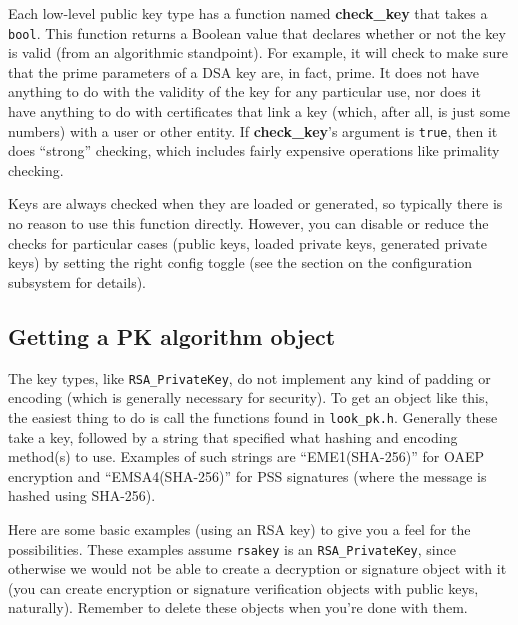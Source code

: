 \documentclass{article}
\newcommand{\filename}[1]{\texttt{#1}}
\newcommand{\function}[1]{\textbf{#1}}
\newcommand{\type}[1]{\texttt{#1}}
\begin{document}
Each low-level public key type has a function named \function{check\_key} that
takes a \type{bool}. This function returns a Boolean value that declares
whether or not the key is valid (from an algorithmic standpoint). For example,
it will check to make sure that the prime parameters of a DSA key are, in fact,
prime. It does not have anything to do with the validity of the key for any
particular use, nor does it have anything to do with certificates that link a
key (which, after all, is just some numbers) with a user or other entity. If
\function{check\_key}'s argument is \type{true}, then it does ``strong''
checking, which includes fairly expensive operations like primality checking.

Keys are always checked when they are loaded or generated, so typically there
is no reason to use this function directly. However, you can disable or reduce
the checks for particular cases (public keys, loaded private keys, generated
private keys) by setting the right config toggle (see the section on the
configuration subsystem for details).

\subsection{Getting a PK algorithm object}

The key types, like \type{RSA\_PrivateKey}, do not implement any kind
of padding or encoding (which is generally necessary for security). To
get an object like this, the easiest thing to do is call the functions
found in \filename{look\_pk.h}. Generally these take a key, followed
by a string that specified what hashing and encoding method(s) to
use. Examples of such strings are ``EME1(SHA-256)'' for OAEP
encryption and ``EMSA4(SHA-256)'' for PSS signatures (where the
message is hashed using SHA-256).

Here are some basic examples (using an RSA key) to give you a feel for the
possibilities. These examples assume \type{rsakey} is an
\type{RSA\_PrivateKey}, since otherwise we would not be able to create a
decryption or signature object with it (you can create encryption or signature
verification objects with public keys, naturally). Remember to delete these
objects when you're done with them.
\end{document}
